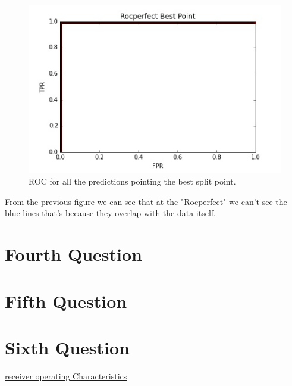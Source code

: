 \documentclass{article}
\begin{document}
\begin{figure}[H]
	\begin{center}
		\includegraphics[scale=0.58]{rocperfect_best.jpg}
	\end{center}
	
	\caption{ROC for all the predictions pointing the best split point.}
\end{figure}
From the previous figure we can see that at the "Rocperfect" we can't see the blue lines that's because they overlap with the data itself.
\section*{Fourth Question}
\section*{Fifth Question}
\section*{Sixth Question}
\begin{thebibliography}{9}
	\href{https://en.wikipedia.org/wiki/Receiver_operating_characteristic}{receiver operating Characteristics }
\end{thebibliography}
\end{document}
